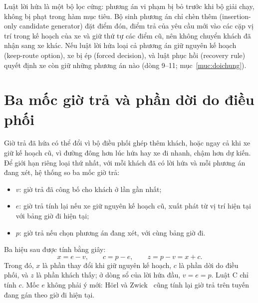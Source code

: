 
Luật lời hứa là một bộ lọc cứng: phương án vi phạm bị bỏ trước khi bộ giải chạy, không bị phạt trong hàm
mục tiêu. Bộ sinh phương án chỉ chèn thêm (insertion-only candidate generator) đặt điểm đón, điểm trả của
yêu cầu mới vào các cặp vị trí trong kế hoạch của xe và giữ thứ tự các điểm cũ, nên không chuyển khách đã
nhận sang xe khác. Nếu luật lời hứa loại cả phương án giữ nguyên kế hoạch (keep-route option), xe bị ép
(forced decision), và luật phục hồi (recovery rule) quyết định xe còn giữ những phương án nào
(dòng 9--11; mục~\ref{muc:doichung}).

\section{Ba mốc giờ trả và phần dời do điều phối}
\label{muc:bamoc}

Giờ trả đã hứa có thể đổi vì bộ điều phối ghép thêm khách, hoặc ngay cả khi xe giữ kế hoạch cũ, vì đường
đông hơn lúc hứa hay xe đi nhanh, chậm hơn dự kiến. Để giới hạn riêng loại thứ nhất, với mỗi khách đã có
lời hứa và mỗi phương án đang xét, hệ thống so ba mốc giờ trả:
\begin{itemize}[leftmargin=1.2cm,itemsep=2pt,topsep=3pt]
\item $v$: giờ trả đã công bố cho khách ở lần gần nhất;
\item $e$: giờ trả tính lại nếu xe giữ nguyên kế hoạch cũ, xuất phát từ vị trí hiện tại với bảng giờ
đi hiện tại;
\item $p$: giờ trả nếu chọn phương án đang xét, với cùng bảng giờ đi.
\end{itemize}
Ba hiệu sau được tính bằng giây:
\begin{equation}
x = e - v, \qquad c = p - e, \qquad z = p - v = x + c .
\label{eq:bamoc}
\end{equation}
Trong đó, $x$ là phần thay đổi khi giữ nguyên kế hoạch, $c$ là phần dời do điều phối, và $z$ là phần
khách thấy; ở dòng sổ của lời hứa đầu, $v = e = p$. Luật C chỉ tính $c$. Mốc $e$ không phải ý mới: Hörl
và Zwick~\cite{horl2022} cũng tính lại giờ trả trên tuyến đang gán theo giờ đi hiện tại.

